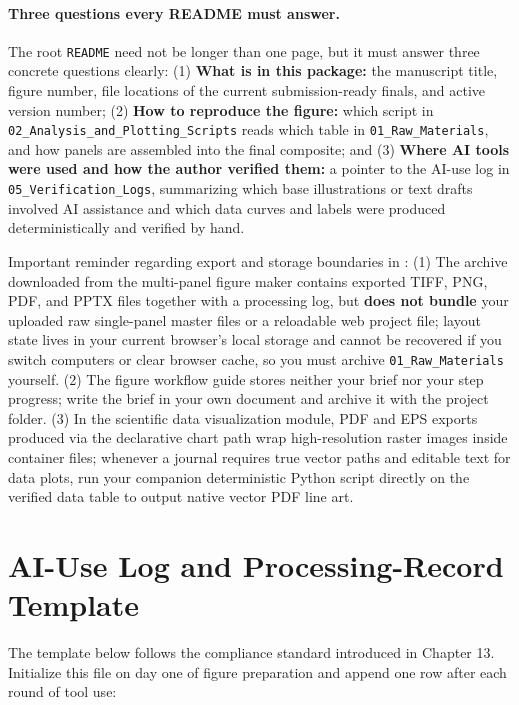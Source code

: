 \paragraph{Three questions every README must answer.}
The root \texttt{README} need not be longer than one page, but it must answer three concrete questions clearly: (1) \textbf{What is in this package:} the manuscript title, figure number, file locations of the current submission-ready finals, and active version number; (2) \textbf{How to reproduce the figure:} which script in \texttt{02\_Analysis\_and\_Plotting\_Scripts} reads which table in \texttt{01\_Raw\_Materials}, and how panels are assembled into the final composite; and (3) \textbf{Where AI tools were used and how the author verified them:} a pointer to the AI-use log in \texttt{05\_Verification\_Logs}, summarizing which base illustrations or text drafts involved AI assistance and which data curves and labels were produced deterministically and verified by hand.

\begin{BookNote}
Important reminder regarding export and storage boundaries in \scidraw{}: (1) The archive downloaded from the multi-panel figure maker contains exported TIFF, PNG, PDF, and PPTX files together with a processing log, but \textbf{does not bundle} your uploaded raw single-panel master files or a reloadable web project file; layout state lives in your current browser's local storage and cannot be recovered if you switch computers or clear browser cache, so you must archive \texttt{01\_Raw\_Materials} yourself. (2) The figure workflow guide stores neither your brief nor your step progress; write the brief in your own document and archive it with the project folder. (3) In the scientific data visualization module, PDF and EPS exports produced via the declarative chart path wrap high-resolution raster images inside container files; whenever a journal requires true vector paths and editable text for data plots, run your companion deterministic Python script directly on the verified data table to output native vector PDF line art.
\end{BookNote}

\section{AI-Use Log and Processing-Record Template}

The template below follows the compliance standard introduced in Chapter 13. Initialize this file on day one of figure preparation and append one row after each round of tool use:

